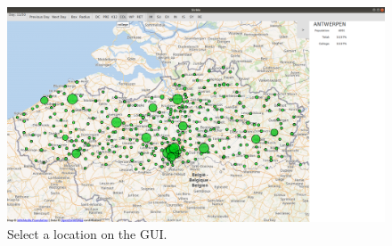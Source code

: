 \begin{figure}[h]
\centering
\includegraphics[width=\textwidth]{locSelect.png}
\caption{Select a location on the GUI.}
\label{gui_location}
\end{figure}




 